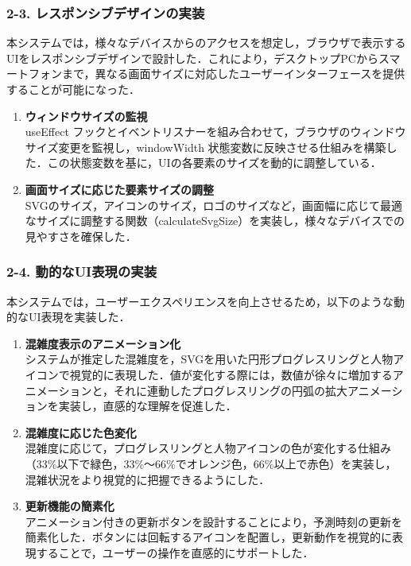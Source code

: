 \subsubsection*{2-3. レスポンシブデザインの実装}
本システムでは，様々なデバイスからのアクセスを想定し，ブラウザで表示するUIをレスポンシブデザインで設計した．これにより，デスクトップPCからスマートフォンまで，異なる画面サイズに対応したユーザーインターフェースを提供することが可能になった．

\begin{enumerate}
	\item {\bfseries ウィンドウサイズの監視}\\
	useEffect フックとイベントリスナーを組み合わせて，ブラウザのウィンドウサイズ変更を監視し，windowWidth 状態変数に反映させる仕組みを構築した．この状態変数を基に，UIの各要素のサイズを動的に調整している．
	
	\item {\bfseries 画面サイズに応じた要素サイズの調整}\\
	SVGのサイズ，アイコンのサイズ，ロゴのサイズなど，画面幅に応じて最適なサイズに調整する関数（calculateSvgSize）を実装し，様々なデバイスでの見やすさを確保した．
\end{enumerate}

\subsubsection*{2-4. 動的なUI表現の実装}
本システムでは，ユーザーエクスペリエンスを向上させるため，以下のような動的なUI表現を実装した．

\begin{enumerate}
	\item {\bfseries 混雑度表示のアニメーション化}\\	
	システムが推定した混雑度を，SVGを用いた円形プログレスリングと人物アイコンで視覚的に表現した．値が変化する際には，数値が徐々に増加するアニメーションと，それに連動したプログレスリングの円弧の拡大アニメーションを実装し，直感的な理解を促進した．
	
	\item {\bfseries 混雑度に応じた色変化}\\	
	混雑度に応じて，プログレスリングと人物アイコンの色が変化する仕組み（33\%以下で緑色，33\%～66\%でオレンジ色，66\%以上で赤色）を実装し，混雑状況をより視覚的に把握できるようにした．
	
	\item {\bfseries 更新機能の簡素化}\\	
	アニメーション付きの更新ボタンを設計することにより，予測時刻の更新を簡素化した．ボタンには回転するアイコンを配置し，更新動作を視覚的に表現することで，ユーザーの操作を直感的にサポートした．
\end{enumerate}

